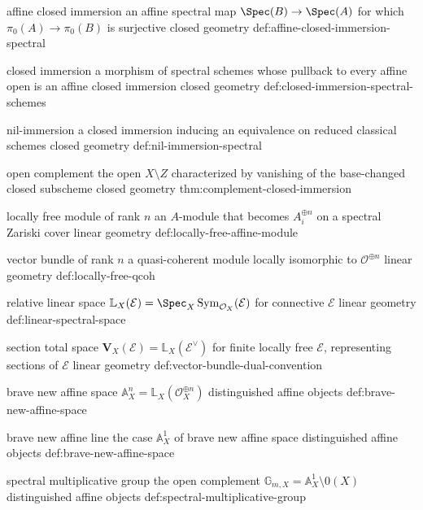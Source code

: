 \begin{longtable}
\CanonicalTerm
{affine closed immersion}
{an affine spectral map \(\Spec(B)\to\Spec(A)\) for which \(\pi_0(A)\to\pi_0(B)\) is surjective}
{closed geometry}
{def:affine-closed-immersion-spectral}

\CanonicalTerm
{closed immersion}
{a morphism of spectral schemes whose pullback to every affine open is an affine closed immersion}
{closed geometry}
{def:closed-immersion-spectral-schemes}

\CanonicalTerm
{nil-immersion}
{a closed immersion inducing an equivalence on reduced classical schemes}
{closed geometry}
{def:nil-immersion-spectral}

\CanonicalTerm
{open complement}
{the open \(X\setminus Z\) characterized by vanishing of the base-changed closed subscheme}
{closed geometry}
{thm:complement-closed-immersion}

\CanonicalTerm
{locally free module of rank \(n\)}
{an \(A\)-module that becomes \(A_i^{\oplus n}\) on a spectral Zariski cover}
{linear geometry}
{def:locally-free-affine-module}

\CanonicalTerm
{vector bundle of rank \(n\)}
{a quasi-coherent module locally isomorphic to \(\mathcal O^{\oplus n}\)}
{linear geometry}
{def:locally-free-qcoh}

\CanonicalTerm
{relative linear space}
{\(\mathbb L_X(\mathcal E)=\Spec_X\operatorname{Sym}_{\mathcal O_X}(\mathcal E)\) for connective \(\mathcal E\)}
{linear geometry}
{def:linear-spectral-space}

\CanonicalTerm
{section total space}
{\(\mathbf V_X(\mathcal E)=\mathbb L_X(\mathcal E^\vee)\) for finite locally free \(\mathcal E\), representing sections of \(\mathcal E\)}
{linear geometry}
{def:vector-bundle-dual-convention}

\CanonicalTerm
{brave new affine space}
{\(\mathbb A_X^n=\mathbb L_X(\mathcal O_X^{\oplus n})\)}
{distinguished affine objects}
{def:brave-new-affine-space}

\CanonicalTerm
{brave new affine line}
{the case \(\mathbb A_X^1\) of brave new affine space}
{distinguished affine objects}
{def:brave-new-affine-space}

\CanonicalTerm
{spectral multiplicative group}
{the open complement \(\mathbb G_{m,X}=\mathbb A_X^1\setminus0(X)\)}
{distinguished affine objects}
{def:spectral-multiplicative-group}

\end{longtable}


